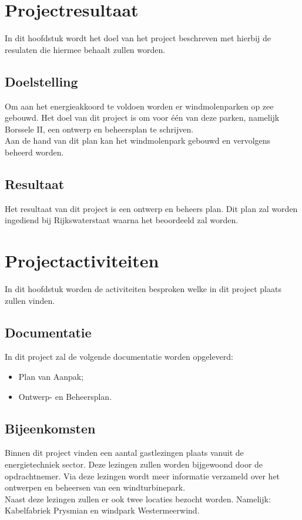 \documentclass[numbers=endperiod]{scrartcl}
\newcommand{\whitespace}{\vspace*{2 mm} \\}%
\begin{document}
	\section{Projectresultaat}
	In dit hoofdstuk wordt het doel van het project beschreven met hierbij de resulaten die hiermee behaalt zullen worden.
	
	\subsection{Doelstelling}
	Om aan het energieakkoord te voldoen worden er windmolenparken op zee gebouwd. Het doel van dit project is om voor één van deze parken, namelijk Borssele II, een ontwerp en beheersplan te schrijven.
	\whitespace
	Aan de hand van dit plan kan het windmolenpark gebouwd en vervolgens beheerd worden.
	
	\subsection{Resultaat}	
	Het resultaat van dit project is een ontwerp en beheers plan. Dit plan zal worden ingediend bij Rijkswaterstaat waarna het beoordeeld zal worden.

	\section{Projectactiviteiten}
	In dit hoofdstuk worden de activiteiten besproken welke in dit project plaats zullen vinden.
	\subsection{Documentatie}
	In dit project zal de volgende documentatie worden opgeleverd:
	\begin{itemize}
	\item Plan van Aanpak;
	\item Ontwerp- en Beheersplan.
	\end{itemize}
	
	\subsection{Bijeenkomsten}
	Binnen dit project vinden een aantal gastlezingen plaats vanuit de energietechniek sector. Deze lezingen zullen worden bijgewoond door de opdrachtnemer. Via deze lezingen wordt meer informatie verzameld over het ontwerpen en beheersen van een windturbinepark.
	\whitespace
	Naast deze lezingen zullen er ook twee locaties bezocht worden. Namelijk: Kabelfabriek Prysmian en windpark Westermeerwind.
\end{document}
